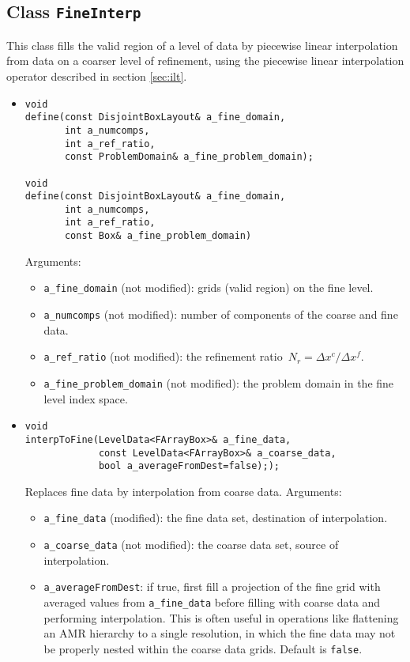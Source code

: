 \newcommand{\sfrac}[2]{\mbox{$\frac{#1}{#2}$}}

\subsection{Class {\tt FineInterp}}

This class fills the valid region of a level of data by piecewise
linear interpolation from data on a coarser level of refinement, using
the piecewise linear interpolation operator described in section
\ref{sec:ilt}.

\begin{itemize}
\item
\begin{verbatim}
void 
define(const DisjointBoxLayout& a_fine_domain,
       int a_numcomps,                        
       int a_ref_ratio,                       
       const ProblemDomain& a_fine_problem_domain);      

void
define(const DisjointBoxLayout& a_fine_domain,
       int a_numcomps, 
       int a_ref_ratio,
       const Box& a_fine_problem_domain)
\end{verbatim}
Arguments:
\begin{itemize}
\item
\verb|a_fine_domain| (not modified): grids (valid region) on the fine level.
\item
\verb|a_numcomps| (not modified): number of components of the coarse
and fine data.
\item
\verb|a_ref_ratio| (not modified): the refinement ratio~$N_r = \Delta
x^c / \Delta x^f$.
\item
\verb|a_fine_problem_domain| (not modified): the problem domain in the
fine level index space.
\end{itemize}

\item
\begin{verbatim}
void 
interpToFine(LevelData<FArrayBox>& a_fine_data,
             const LevelData<FArrayBox>& a_coarse_data,
             bool a_averageFromDest=false););
\end{verbatim}
Replaces fine data by interpolation from coarse data.
Arguments:
\begin{itemize}
\item
\verb|a_fine_data| (modified): the fine data set, destination of
interpolation. 
\item
\verb|a_coarse_data| (not modified): the coarse data set, source of
interpolation. 
\item
\verb|a_averageFromDest|: if true, first fill a projection of the fine grid with averaged values from {\tt a\_fine\_data} before filling with coarse data and performing interpolation. This is often useful in operations like flattening an AMR hierarchy to a single resolution, in which the fine data may not be properly nested within the coarse data grids. Default is {\tt false}.
\end{itemize}


\end{itemize}
